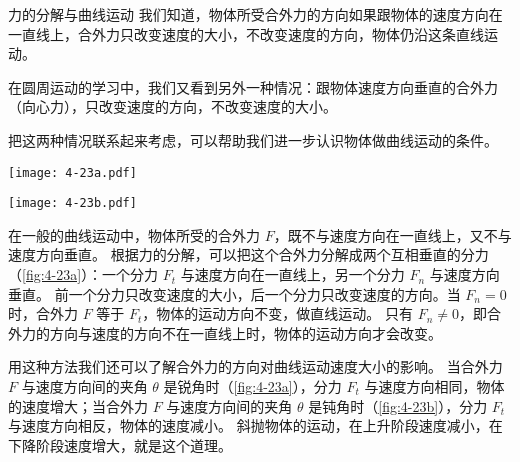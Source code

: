 \begin{Reading}{力的分解与曲线运动}
我们知道，物体所受合外力的方向如果跟物体的速度方向在一直线上，合外力只改变速度的大小，不改变速度的方向，物体仍沿这条直线运动。

在圆周运动的学习中，我们又看到另外一种情况：跟物体速度方向垂直的合外力（向心力），只改变速度的方向，不改变速度的大小。

把这两种情况联系起来考虑，可以帮助我们进一步认识物体做曲线运动的条件。
\begin{figurehere}
  \nextfloat
  \begin{minipage}[b]{0.48\linewidth}\centering
    \texttt{[image: 4-23a.pdf]}
    \subcaption{}\label{fig:4-23a}
  \end{minipage}
  \begin{minipage}[b]{0.48\linewidth}\centering
    \texttt{[image: 4-23b.pdf]}
    \subcaption{}\label{fig:4-23b}
  \end{minipage}
  \caption{}\label{fig:4-23}
\end{figurehere}

在一般的曲线运动中，物体所受的合外力 $F$，既不与速度方向在一直线上，又不与速度方向垂直。
根据力的分解，可以把这个合外力分解成两个互相垂直的分力（\cref{fig:4-23a}）：一个分力 $F_t$ 与速度方向在一直线上，另一个分力 $F_n$ 与速度方向垂直。
前一个分力只改变速度的大小，后一个分力只改变速度的方向。当 $F_n=0$ 时，合外力 $F$ 等于 $F_t$，物体的运动方向不变，做直线运动。
只有 $F_n\ne 0$，即合外力的方向与速度的方向不在一直线上时，物体的运动方向才会改变。

用这种方法我们还可以了解合外力的方向对曲线运动速度大小的影响。
当合外力 $F$ 与速度方向间的夹角 $\theta$ 是锐角时（\cref{fig:4-23a}），分力 $F_t$ 与速度方向相同，物体的速度增大；当合外力 $F$ 与速度方向间的夹角 $\theta$ 是钝角时（\cref{fig:4-23b}），分力 $F_t$ 与速度方向相反，物体的速度减小。
斜抛物体的运动，在上升阶段速度减小，在下降阶段速度增大，就是这个道理。
\end{Reading}

